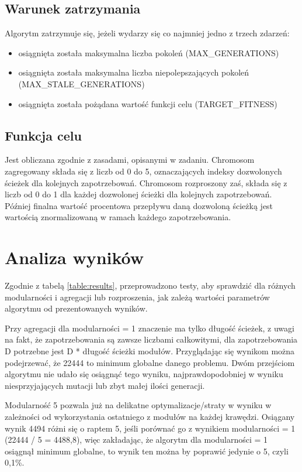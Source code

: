 \subsection{Warunek zatrzymania}

Algorytm zatrzymuje się, jeżeli wydarzy się co najmniej jedno z trzech zdarzeń:
\begin{itemize}
    \item osiągnięta została maksymalna liczba pokoleń (MAX\_GENERATIONS)
    \item osiągnięta została maksymalna liczba niepolepszających pokoleń (MAX\_STALE\_GENERATIONS)
    \item osiągnięta została pożądana wartość funkcji celu (TARGET\_FITNESS)
\end{itemize}

\subsection{Funkcja celu}

Jest obliczana zgodnie z zasadami, opisanymi w zadaniu. Chromosom zagregowany składa się z liczb od 0 do 5, oznaczających indeksy dozwolonych ścieżek dla kolejnych zapotrzebowań. Chromosom rozproszony zaś, składa się z liczb od 0 do 1 dla każdej dozwolonej ścieżki dla kolejnych zapotrzebowań. Później finalna wartość procentowa przepływu daną dozwoloną ścieżką jest wartością znormalizowaną w ramach każdego zapotrzebowania.

\section{Analiza wyników}

Zgodnie z tabelą \ref{table:results}, przeprowadzono testy, aby sprawdzić dla różnych modularności  i agregacji lub rozproszenia, jak zależą wartości parametrów algorytmu od prezentowanych wyników. 

Przy agregacji dla modularności = 1 znaczenie ma tylko długość ścieżek, z uwagi na fakt, że zapotrzebowania są zawsze liczbami całkowitymi, dla zapotrzebowania D potrzebne jest D * długość ścieżki modułów. Przyglądając się wynikom można podejrzewać, że 22444 to minimum globalne danego problemu. Dwóm przejściom algorytmu nie udało się osiągnąć tego wyniku, najprawdopodobniej w wyniku niesprzyjających mutacji lub zbyt małej ilości generacji.

Modularność 5 pozwala już na delikatne optymalizacje/straty w wyniku w zależności od wykorzystania ostatniego z modułów na każdej krawędzi. Osiągany wynik 4494 różni się o raptem 5, jeśli porównać go z wynikiem modularności = 1 (22444 / 5 = 4488,8), więc zakładając, że algorytm dla modularności = 1 osiągnął minimum globalne, to wynik ten można by poprawić jedynie o 5, czyli 0,1\%.

